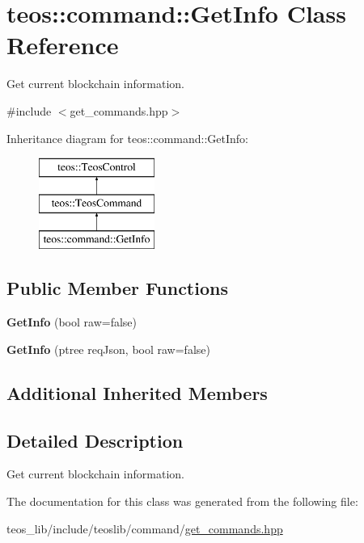 \hypertarget{classteos_1_1command_1_1_get_info}{}\section{teos\+:\+:command\+:\+:Get\+Info Class Reference}
\label{classteos_1_1command_1_1_get_info}


Get current blockchain information.  




{\ttfamily \#include $<$get\+\_\+commands.\+hpp$>$}

Inheritance diagram for teos\+:\+:command\+:\+:Get\+Info\+:\begin{figure}[H]
\begin{center}
\leavevmode
\includegraphics[height=3.000000cm]{classteos_1_1command_1_1_get_info}
\end{center}
\end{figure}
\subsection*{Public Member Functions}
\begin{DoxyCompactItemize}
\item 
\mbox{\label{classteos_1_1command_1_1_get_info_ac15b485dd53c3b440a09bdb2be5bbc27}} 
{\bfseries Get\+Info} (bool raw=false)
\item 
\mbox{\label{classteos_1_1command_1_1_get_info_ac12a0c7b894af0d486737d299c776244}} 
{\bfseries Get\+Info} (ptree req\+Json, bool raw=false)
\end{DoxyCompactItemize}
\subsection*{Additional Inherited Members}


\subsection{Detailed Description}
Get current blockchain information. 

The documentation for this class was generated from the following file\+:\begin{DoxyCompactItemize}
\item 
teos\+\_\+lib/include/teoslib/command/\mbox{\hyperlink{get__commands_8hpp}{get\+\_\+commands.\+hpp}}\end{DoxyCompactItemize}
